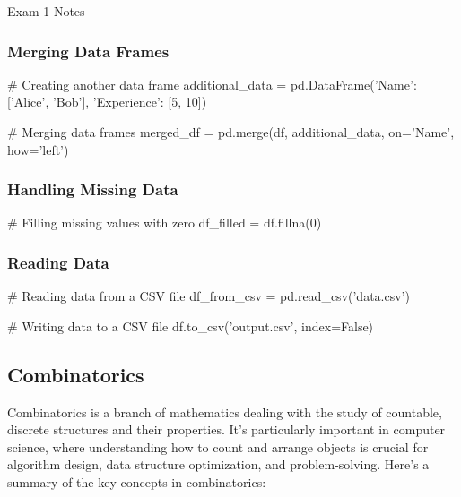 \begin{examnotes}{Exam 1 Notes}
\begin{highlight}
        \subsubsection*{Merging Data Frames}

    \begin{code}[Python]
    # Creating another data frame
    additional_data = pd.DataFrame({'Name': ['Alice', 'Bob'], 'Experience': [5, 10]})
    
    # Merging data frames
    merged_df = pd.merge(df, additional_data, on='Name', how='left')        
    \end{code}

        \subsubsection*{Handling Missing Data}

    \begin{code}[Python]
    # Filling missing values with zero
    df_filled = df.fillna(0)        
    \end{code}

        \subsubsection*{Reading Data}

    \begin{code}[Python]
    # Reading data from a CSV file
    df_from_csv = pd.read_csv('data.csv')
    
    # Writing data to a CSV file
    df.to_csv('output.csv', index=False)        
    \end{code}
    \end{highlight}

    \subsection*{Combinatorics}

    Combinatorics is a branch of mathematics dealing with the study of countable, discrete structures and their properties. It's particularly important in computer science, where understanding how to 
    count and arrange objects is crucial for algorithm design, data structure optimization, and problem-solving. Here's a summary of the key concepts in combinatorics:


\end{examnotes}
